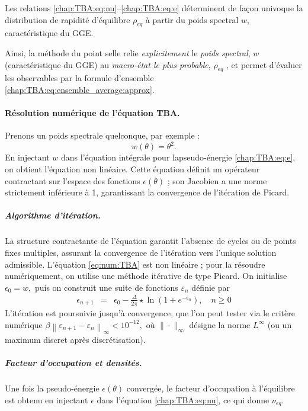 Les relations \eqref{chap:TBA:eq:nu}–\eqref{chap:TBA:eq:e} déterminent de façon univoque la distribution de rapidité d’équilibre \(\rho_{\!eq}\) à partir du poids spectral \(w\), caractéristique du GGE.

\medskip
Ainsi, la méthode du point selle relie \emph{explicitement} le {\em poids spectral}, $w$  (caractéristique du GGE) au \emph{macro-état le plus probable}, $\rho_{eq}$ , et permet d’évaluer les observables par la formule d’ensemble \eqref{chap:TBA:eq:ensemble_average:approx}.


\paragraph{Résolution numérique de l’équation TBA.}\label{para-algho-TBA}

Prenons un poids spectrale quelconque, par exemple : 
\begin{equation}
  w(\theta)= \theta^2 .\label{eq:TBA:w:quadra}
\end{equation} 
En injectant $w$ dans l’équation intégrale pour lapseudo-énergie \eqref{chap:TBA:eq:e}, on obtient l’équation non linéaire.
Cette équation définit un opérateur contractant sur l’espace des fonctions
\( \epsilon(\theta) \) ; son Jacobien a une norme strictement
inférieure à 1, garantissant la convergence de l’itération de Picard.

\medskip
\subparagraph{Algorithme d’itération.}  
La structure contractante de l’équation garantit l’absence de cycles ou de points fixes multiples, assurant la convergence de l’itération vers l’unique solution admissible.
L’équation \eqref{eq:num:TBA} est non linéaire ; pour la résoudre numériquement, on utilise une méthode itérative de type Picard. On initialise
\(
  \epsilon_0 = w ,
\)
puis on construit une suite de fonctions \(\varepsilon_n\) définie par
\begin{eqnarray*}
	\epsilon_{n+1} & = & \epsilon_0 -   \frac{\Delta}{2\pi} \star \ln \left( 1 + e^{-\epsilon_n} \right) ,\quad n\ge0
\end{eqnarray*}
L’itération est poursuivie jusqu’à convergence, que l’on peut tester via le critère numérique
\(
  \beta \left\| \varepsilon_{n+1} - \varepsilon_n \right\|_\infty < 10^{-12},
\)
où \(\|\cdot\|_\infty\) désigne la norme \(L^\infty\) (ou un maximum discret après discrétisation).


\medskip
\subparagraph{Facteur d’occupation et densités.}  
Une fois la pseudo-énergie \( \epsilon(\theta) \) convergée, le facteur d’occupation  à l'équilibre est obtenu en injectant $\epsilon$ dans l’équation \eqref{chap:TBA:eq:nu}, ce qui donne  $\nu_{\!eq}$.
 

